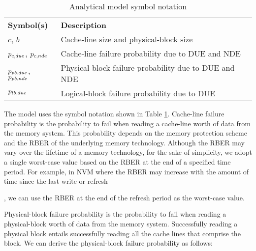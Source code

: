 
\begin{table}
\caption{Analytical model symbol notation}
\label{tab:model}
\centering
\begin{tabular}{lp{6.5cm}}
\textbf{Symbol(s)} & \textbf{Description} \\
$c$, $b$        & \scriptsize{Cache-line size and physical-block size}\\
${p_{c,due}}$, ${p_{c,nde}}$  & \scriptsize{Cache-line failure probability due to DUE and NDE}\\
${p_{pb,due}}$, ${p_{pb,nde}}$  & \scriptsize{Physical-block failure probability due to DUE and NDE}\\
${p_{lb,due}}$  & \scriptsize{Logical-block failure probability due to DUE}\\
\end{tabular}
\end{table}

The model uses the symbol notation shown in Table \ref{tab:model}.
%
Cache-line failure probability is the probability to fail when reading a cache-line worth of data from the memory system.
This probability depends on the memory protection scheme and the RBER of the underlying memory technology.
Although the RBER may vary over the lifetime of a memory technology, for the sake of simplicity, we adopt a single worst-case value based on the RBER at the end of a specified time period. 
For example, in NVM where the RBER may increase with the amount of time since the last write or refresh~\cite{zhang:pm-chipkill:micro:2018}, we can use the RBER at the end of the refresh period as the worst-case value.

Physical-block failure probability is the probability to fail when reading a physical-block worth of data from the memory system.
Successfully reading a physical block entails successfully reading all the cache lines that comprise the block. 
We can derive the physical-block failure probability as follows:


